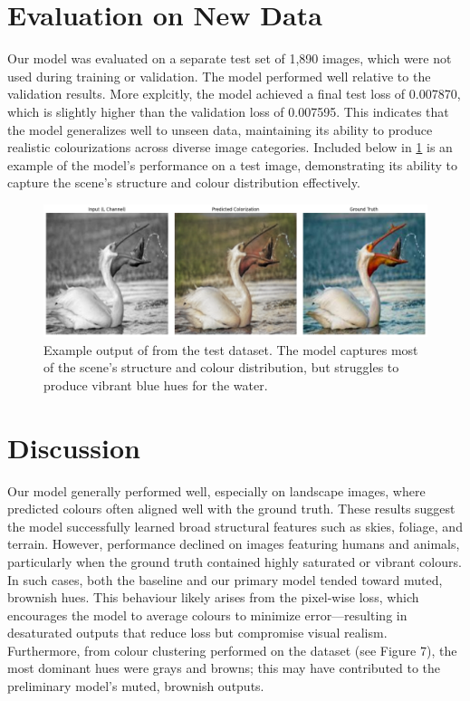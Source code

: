 \documentclass{article} %
\begin{document}
\section{Evaluation on New Data}
\label{new_data}

Our model was evaluated on a separate test set of 1,890 images, which were not used during training or validation. The model performed well relative to the validation results. More explcitly, the model achieved 
a final test loss of 0.007870, which is slightly higher than the validation loss of 0.007595. This indicates that the model generalizes well to unseen data, maintaining its ability to produce realistic colourizations across diverse image categories. 
Included below in \ref{fig:test-data-example} is an example of the model's performance on a test image, demonstrating its ability to capture the scene's structure and colour distribution effectively.

\begin{figure}[htbp]            %
  \centering
  \includegraphics[width=0.9\linewidth]{Figs/test_data_result_example.png}
  \caption{Example output of from the test dataset. The model captures most of the scene's structure and colour distribution, but struggles to produce vibrant blue hues for the water.}
  \label{fig:test-data-example}
\end{figure}

\section{Discussion}
\label{discussion}

Our model generally performed well, especially on landscape images, where predicted colours often aligned well with the ground truth. These results suggest the model successfully
learned broad structural features such as skies, foliage, and terrain. However, performance declined on images featuring humans and animals, particularly when the ground truth
contained highly saturated or vibrant colours. In such cases, both the baseline and our primary model tended toward muted, brownish hues. This behaviour likely arises from the
pixel-wise loss, which encourages the model to average colours to minimize error—resulting in desaturated outputs that reduce loss but compromise visual realism. Furthermore, 
from colour clustering performed on the dataset (see Figure 7), the most dominant hues were grays and browns; this may have contributed to the preliminary model's muted, brownish outputs. 
\end{document}
